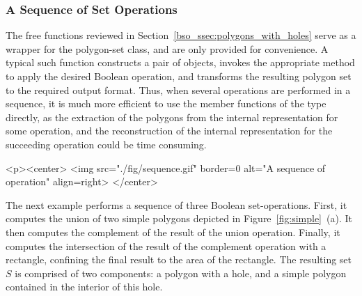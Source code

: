 \subsubsection{A Sequence of Set Operations\label{bso_sssec:sequence}}

The free functions reviewed in Section~\ref{bso_ssec:polygons_with_holes}
serve as a wrapper for the polygon-set class, and are only provided for
convenience. A typical such function constructs a pair of
 objects, invokes the appropriate method to
apply the desired Boolean operation, and transforms the resulting
polygon set to the required output format. Thus, when several
operations are performed in a sequence, it is much more efficient to
use the member functions of the  type
directly, as the extraction of the polygons from the internal
representation for some operation, and the reconstruction of the
internal representation for the succeeding operation could be time
consuming.

\lcTex{%
  \setlength{\BooleanSetOpsWidthRight}{2.3cm}
  \setlength{\BooleanSetOpsWidthLeft}{\BooleanSetOpsWidthLineReal}
  \addtolength{\BooleanSetOpsWidthLeft}{-\BooleanSetOpsWidthRight}
  \begin{minipage}{\BooleanSetOpsWidthLeft}
}
\label{fig:sequence}
\begin{ccHtmlOnly}
  <p><center>
    <img src="./fig/sequence.gif" border=0 alt="A sequence of operation" align=right>
  </center>
\end{ccHtmlOnly}
The next example performs a sequence of three Boolean set-operations.
First, it computes the union of two simple polygons depicted in
Figure~\ref{fig:simple}~(a). It then computes the complement of the result
of the union operation. Finally, it computes the intersection of the result
of the complement operation with a rectangle, confining the final result to 
the area of the rectangle. The resulting set $S$ is comprised of two
components: a polygon with a hole, and a simple polygon contained in the
interior of this hole.

